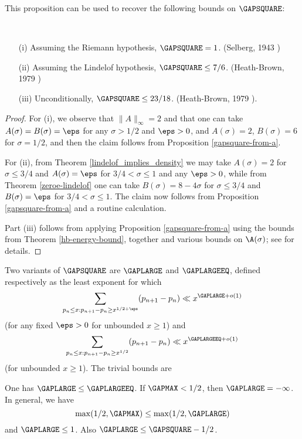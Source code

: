 

This proposition can be used to recover the following bounds on $\GAPSQUARE$:

\begin{corollary}\
    \begin{itemize}
    \item[(i)] Assuming the Riemann hypothesis, $\GAPSQUARE = 1$. (Selberg, 1943 \cite{selberg_1943})
    \item[(ii)] Assuming the Lindelof hypothesis, $\GAPSQUARE \leq 7/6$. (Heath-Brown, 1979 \cite{heath_brown_consecutive_II})
    \item[(iii)] Unconditionally, $\GAPSQUARE \leq 23/18$. (Heath-Brown, 1979 \cite{heath_brown_consecutive_III}).
\end{itemize}
\end{corollary}

\begin{proof} For (i), we observe that $\|A\|_\infty=2$ and that one can take $A(\sigma)=B(\sigma)=\eps$ for any $\sigma>1/2$ and $\eps>0$, and $A(\sigma)=2$, $B(\sigma)=6$ for $\sigma=1/2$, and then the claim follows from Proposition \ref{gapsquare-from-a}.

For (ii), from Theorem \ref{lindelof_implies_density} we may take $A(\sigma)=2$ for $\sigma \leq 3/4$ and $A(\sigma)=\eps$ for $3/4 < \sigma \leq 1$ and any $\eps>0$, while from Theorem \ref{zeroe-lindelof} one can take $B(\sigma) = 8-4\sigma$ for $\sigma \leq 3/4$ and $B(\sigma)=\eps$ for $3/4 < \sigma \leq 1$.  The claim now follows from Proposition \ref{gapsquare-from-a} and a routine calculation.

Part (iii) follows from applying Proposition \ref{gapsquare-from-a} using the bounds from Theorem \ref{hb-energy-bound}, together and various bounds on $\A(\sigma)$; see \cite[Theorem 12.14]{ivic} for details.
\end{proof}

Two variants of $\GAPSQUARE$ are $\GAPLARGE$ and $\GAPLARGEEQ$, defined respectively as the least exponent for which
$$ \sum_{p_n \leq x: p_{n+1}-p_n \geq x^{1/2+\eps}} (p_{n+1}-p_n) \ll x^{\GAPLARGE+o(1)}$$
(for any fixed $\eps>0$ for unbounded $x \geq 1$) and
$$ \sum_{p_n \leq x: p_{n+1}-p_n \geq x^{1/2}} (p_{n+1}-p_n) \ll x^{\GAPLARGEEQ+o(1)}$$
(for unbounded $x \geq 1$).  The trivial bounds are

\begin{proposition}\label{trivial-large-gap}  One has $\GAPLARGE \le \GAPLARGEEQ$. If $\GAPMAX < 1/2$, then $\GAPLARGE = -\infty$.  In general, we have
    $$ \max(1/2,\GAPMAX) \leq \max(1/2, \GAPLARGE)$$
    and $\GAPLARGE \leq 1$.  Also $\GAPLARGE \leq \GAPSQUARE - 1/2$.
\end{proposition}

